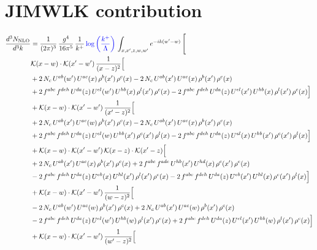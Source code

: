\documentclass[9pt]{article}
\numberwithin{equation}{section}
\begin{document}
\section{JIMWLK contribution}
\begin{align}
\frac{d^{3}N_{\mathrm{NLO}}}{d^{3}k} & = \frac{1}{(2\pi)^{3}}\,\frac{g^{4}}{16\pi^{5}}\,\frac{1}{k^{+}}\,{\color{blue}\log{\left(\frac{k^{+}}{\Lambda}\right)}}\,\int_{x,x',z,w,w'}e^{-ik(w'-w)}\,\Bigg[
\notag \\ & \mathcal{K}(x-w)\cdot\mathcal{K}(x'-w')\,\frac{1}{(x-z)^{2}}\Big[\notag\\
&+2\,N_{c}\,U^{ab}(w')\,U^{ac}(x)\,\rho^{b}(x')\,\rho^{c}(x) -2\,N_{c}\,U^{ab}(x')\,U^{ac}(x)\,\rho^{b}(x')\,\rho^{c}(x)\notag\\
& +2\,f^{abc}\,f^{deh}\,U^{da}(z)\,U^{el}(w')\,U^{hb}(x)\,\rho^{l}(x')\,\rho^{c}(x) -2\,f^{abc}\,f^{deh}\,U^{da}(z)\,U^{el}(x')\,U^{hb}(x)\,\rho^{l}(x')\,\rho^{c}(x)\Big]\notag\\
& +\mathcal{K}(x-w)\cdot\mathcal{K}(x'-w')\,\frac{1}{(x'-z)^{2}}\Big[\notag\\
& +2\,N_{c}\,U^{ab}(x')\,U^{ac}(w)\,\rho^{b}(x')\,\rho^{c}(x) -2\,N_{c}\,U^{ab}(x')\,U^{ac}(x)\,\rho^{b}(x')\,\rho^{c}(x)\notag\\
& +2\,f^{abc}\,f^{deh}\,U^{da}(z)\,U^{el}(w)\,U^{hb}(x')\,\rho^{c}(x')\,\rho^{l}(x) -2\,f^{abc}\,f^{deh}\,U^{da}(z)\,U^{el}(x)\,U^{hb}(x')\,\rho^{c}(x')\,\rho^{l}(x)\Big]\notag\\
& +\mathcal{K}(x-w)\cdot\mathcal{K}(x'-w')\,\mathcal{K}(x-z)\cdot\mathcal{K}(x'-z)\Big[\notag\\
& +2\,N_{c}\,U^{ab}(x')\,U^{ac}(x)\,\rho^{b}(x')\,\rho^{c}(x) +2\,f^{abc}\,f^{ade}\,U^{hb}(x')\,U^{hd}(x)\,\rho^{c}(x')\,\rho^{e}(x)\notag\\
& -2\,f^{abc}\,f^{deh}\,U^{da}(z)\,U^{eb}(x)\,U^{hl}(x')\,\rho^{l}(x')\,\rho^{c}(x) -2\,f^{abc}\,f^{deh}\,U^{da}(z)\,U^{eb}(x')\,U^{hl}(x)\,\rho^{c}(x')\,\rho^{l}(x)\Big]\notag\\
& +\mathcal{K}(x-w)\cdot\mathcal{K}(x'-w')\,\frac{1}{(w-z)^{2}}\Big[\notag\\
& -2\,N_{c}\,U^{ab}(w')\,U^{ac}(w)\,\rho^{b}(x')\,\rho^{c}(x) +2\,N_{c}\,U^{ab}(x')\,U^{ac}(w)\,\rho^{b}(x')\,\rho^{c}(x)\notag\\
& -2\,f^{abc}\,f^{deh}\,U^{da}(z)\,U^{el}(w')\,U^{hb}(w)\,\rho^{l}(x')\,\rho^{c}(x) +2\,f^{abc}\,f^{deh}\,U^{da}(z)\,U^{el}(x')\,U^{hb}(w)\,\rho^{l}(x')\,\rho^{c}(x)\Big]\notag\\
& +\mathcal{K}(x-w)\cdot\mathcal{K}(x'-w')\,\frac{1}{(w'-z)^{2}}\Big[\notag\\

\end{align}
\end{document}

